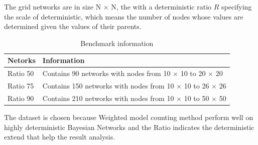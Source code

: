 \noindent The grid networks are in size N $\times$ N, the with a deterministic ratio $R$ specifying the scale of deterministic, which means the number of nodes whose values are determined given the values of their parents. \\

\begin{table}[]
    \centering
    \begin{tabular}{l p{5cm}}
    \hline
    Netorks	&	Information	\\
    \hline
    \hline
    Ratio 50	&	Contains 90 networks with nodes from 10 $\times$ 10 to  20 $\times$ 20 	\\
    \hline
    Ratio 75	&	Contains 150 networks with nodes from 10 $\times$ 10 to  26 $\times$ 26 	\\
    \hline
    Ratio 90	&	Contains 210 networks with nodes from 10 $\times$ 10 to  50 $\times$ 50  \\
    \hline
    \end{tabular}
    \caption{Benchmark information}
    \label{tab:benchmark_info}
\end{table}


\noindent The dataset is chosen because Weighted model counting method perform well on highly deterministic Bayesian Networks and the Ratio indicates the deterministic extend that help the result analysis.

